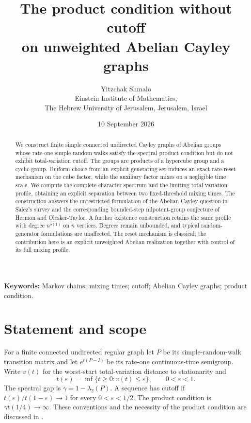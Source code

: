 \documentclass[11pt]{article}
\title{The product condition without cutoff\protect\\on unweighted Abelian Cayley graphs}
\author{Yitzchak Shmalo\\[3pt]
\small Einstein Institute of Mathematics,\\
\small The Hebrew University of Jerusalem, Jerusalem, Israel\\
\small }\date{10 September 2026}
\theoremstyle{remark}\newtheorem{remark}[theorem]{Remark}
\begin{document}
\maketitle
\begin{abstract}
We construct finite simple connected undirected Cayley graphs of Abelian groups whose rate-one simple random walks satisfy the spectral product condition but do not exhibit total-variation cutoff. The groups are products of a hypercube group and a cyclic group. Uniform choice from an explicit generating set induces an exact rare-reset mechanism on the cube factor, while the auxiliary factor mixes on a negligible time scale. We compute the complete character spectrum and the limiting total-variation profile, obtaining an explicit separation between two fixed-threshold mixing times. The construction answers the unrestricted formulation of the Abelian Cayley question in Salez's survey and the corresponding bounded-step nilpotent-group conjecture of Hermon and Olesker-Taylor. A further existence construction retains the same profile with degree $n^{o(1)}$ on $n$ vertices. Degrees remain unbounded, and typical random-generator formulations are unaffected. The reset mechanism is classical; the contribution here is an explicit unweighted Abelian realization together with control of its full mixing profile.
\end{abstract}
\noindent\textbf{Keywords:} Markov chains; mixing times; cutoff; Abelian Cayley graphs; product condition.


\section{Statement and scope}
For a finite connected undirected regular graph let $P$ be its simple-random-walk transition matrix and let $e^{t(P-I)}$ be its rate-one continuous-time semigroup. Write $v(t)$ for the worst-start total-variation distance to stationarity and
\[
 t(\varepsilon)=\inf\{t\ge0:v(t)\le\varepsilon\},\qquad 0<\varepsilon<1.
\]
The spectral gap is $\gamma=1-\lambda_2(P)$. A sequence has cutoff if $t(\varepsilon)/t(1-\varepsilon)\to1$ for every $0<\varepsilon<1/2$. The product condition is $\gamma t(1/4)\to\infty$. These conventions and the necessity of the product condition are discussed in \cite[Chapter 18]{LPW}.
\end{document}
